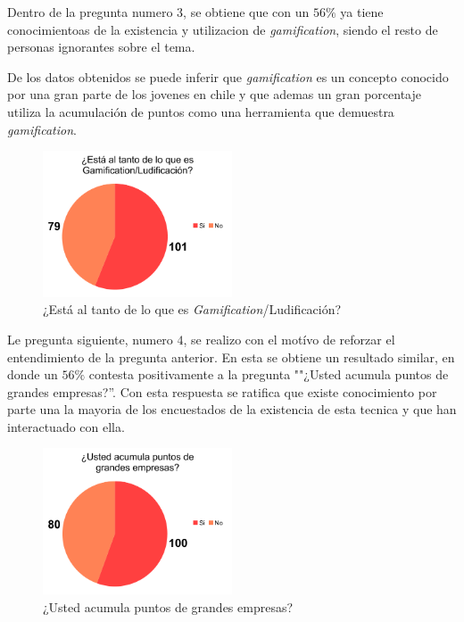 Dentro de la pregunta numero 3, se obtiene que con un $56\%$ ya tiene conocimientoas de la existencia
y utilizacion de \emph{gamification}, siendo el resto de personas ignorantes sobre el tema.

De los datos obtenidos se puede inferir que \emph{gamification} es un concepto conocido por una gran parte
de los jovenes en chile y que ademas un gran porcentaje utiliza la acumulación de puntos como una
herramienta que demuestra \emph{gamification}.

\begin{figure}[!htb]
  \centering
  \includegraphics[width=0.5\textwidth]{images/chart3.png}
  \caption[chart3]{¿Está al tanto de lo que es \emph{Gamification}/Ludificación?}
  \label{fig:chart1}
\end{figure}

Le pregunta siguiente, numero $4$, se realizo con el motívo de reforzar el entendimiento de la pregunta
anterior. En esta se obtiene un resultado similar, en donde un $56\%$ contesta positivamente a la
pregunta ""¿Usted acumula puntos de grandes empresas?''. Con esta respuesta se ratifica que existe
conocimiento por parte una la mayoria de los encuestados de la existencia de esta tecnica y que han
interactuado con ella.

\begin{figure}[!htb]
  \centering
  \includegraphics[width=0.5\textwidth]{images/chartPreg4.png}
  \caption[chart4]{¿Usted acumula puntos de grandes empresas?}
  \label{fig:chart2}
\end{figure}

